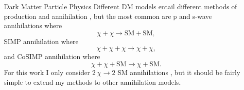 \documentclass[a4paper,11pt]{article}
\begin{document}
\begin{section}{Dark Matter Particle Physics}
    Different DM models entail different methods of production and annihilation \cite{Ilie:2020popiii}, but the most common are p and s-wave annihilations where
    \begin{equation}
        \chi + \chi \to \text{SM} + \text{SM},
    \end{equation}
    SIMP annihilation where
    \begin{equation}
        \chi + \chi  + \chi \to \chi + \chi ,
    \end{equation}
    and CoSIMP annihilation where
    \begin{equation}
        \chi + \chi + \text{SM} \to \chi + \text{SM}.
    \end{equation}
    For this work I only consider $2 ~\chi \to 2$ SM annihilations , but it should be fairly simple to extend my methods to other annihilation models. 
\end{section}
\end{document}
